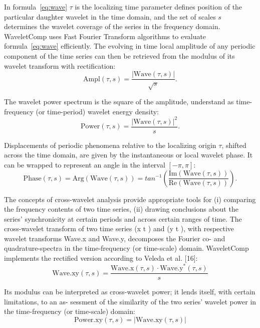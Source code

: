 \documentclass{biophys-new}
\begin{document}
In formula~\ref{eq:wave} $\tau$ is the localizing time parameter defines position of the particular daughter wavelet in the time domain, and the set of scales $s$ determines the wavelet coverage of the series in the frequency domain.
WaveletComp uses Fast Fourier Transform algorithms to evaluate formula~\ref{eq:wave} efficiently.
The evolving in time local amplitude of any periodic component of the time series can then be retrieved from the modulus of its wavelet transform with rectification:
\begin{equation}\label{eq:amplitude}
\text{Ampl}(\tau, s)=\frac{|\text{Wave}(\tau, s)|}{\sqrt{s}}.
\end{equation}

The wavelet power spectrum is the square of the amplitude, understand as time-frequency (or time-period) wavelet energy density:
\begin{equation}\label{eq:power}
\text{Power}(\tau, s)=\frac{|\text{Wave}(\tau, s)|^2}{s}.
\end{equation}

Displacements of periodic phenomena relative to the localizing origin $\tau$, shifted across the time domain, are given by the instantaneous or local wavelet phase.
It can be wrapped to represent an angle in the interval $[-\pi,\pi]$:
\begin{equation}\label{eq:phase}
\text{Phase}(\tau, s)=\text{Arg}(\text{Wave}(\tau, s))=tan^{-1}\left(\frac{\text{Im}(\text{Wave}(\tau, s))}{\text{Re}(\text{Wave}(\tau, s))}\right).
\end{equation}

The concepts of cross-wavelet analysis provide appropriate tools for (i) comparing the frequency contents of two time series, (ii) drawing conclusions about the series’ synchronicity at certain periods and across certain ranges of time.
The cross-wavelet transform of two time series (x t ) and (y t ), with respective wavelet transforms Wave.x and Wave.y, decomposes the Fourier co- and quadrature-spectra in the time-frequency (or time-scale) domain.
WaveletComp implements the rectified version according to Veleda et al. [16]:
\begin{equation}\label{eq:wave.xy}
\text{Wave.xy}(\tau, s)=\frac{\text{Wave.x}(\tau, s)\cdot\text{Wave.y}^{\ast}(\tau, s)}{s}
\end{equation}

Its modulus can be interpreted as cross-wavelet power; it lends itself, with certain limitations, to an as-
sessment of the similarity of the two series’ wavelet power in the time-frequency (or time-scale) domain:
\begin{equation}\label{eq:power.xy}
\text{Power.xy}(\tau, s)=|\text{Wave.xy}(\tau, s)|
\end{equation}
\end{document}
